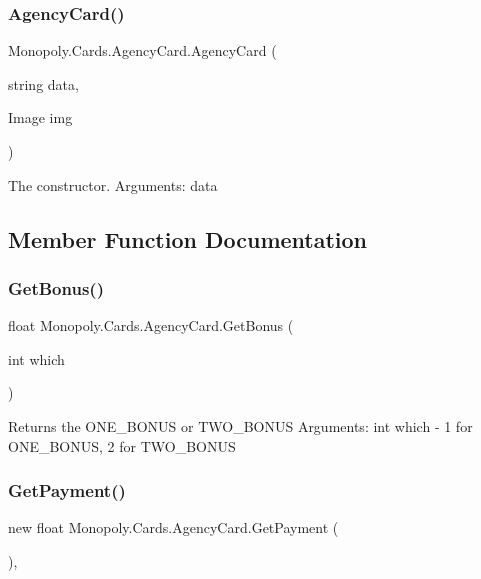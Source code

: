 \subsubsection{\texorpdfstring{Agency\+Card()}{AgencyCard()}}
{\footnotesize\ttfamily Monopoly.\+Cards.\+Agency\+Card.\+Agency\+Card (\begin{DoxyParamCaption}\item[{string}]{data,  }\item[{Image}]{img }\end{DoxyParamCaption})\hspace{0.3cm}{\ttfamily [inline]}}

The constructor. Arguments\+: data 

\subsection{Member Function Documentation}
\mbox{\label{class_monopoly_1_1_cards_1_1_agency_card_af4892a0f8424badd42a01306e705e619}} 
\subsubsection{\texorpdfstring{Get\+Bonus()}{GetBonus()}}
{\footnotesize\ttfamily float Monopoly.\+Cards.\+Agency\+Card.\+Get\+Bonus (\begin{DoxyParamCaption}\item[{int}]{which }\end{DoxyParamCaption})\hspace{0.3cm}{\ttfamily [inline]}}

Returns the O\+N\+E\+\_\+\+B\+O\+N\+US or T\+W\+O\+\_\+\+B\+O\+N\+US Arguments\+: int which -\/ 1 for O\+N\+E\+\_\+\+B\+O\+N\+US, 2 for T\+W\+O\+\_\+\+B\+O\+N\+US \mbox{\label{class_monopoly_1_1_cards_1_1_agency_card_a7463b9f93db864ea03b2e0d6b2973e41}} 
\subsubsection{\texorpdfstring{Get\+Payment()}{GetPayment()}\hspace{0.1cm}{\footnotesize\ttfamily [1/2]}}
{\footnotesize\ttfamily new float Monopoly.\+Cards.\+Agency\+Card.\+Get\+Payment (\begin{DoxyParamCaption}{ }\end{DoxyParamCaption})\hspace{0.3cm}{\ttfamily [inline]}, {\ttfamily [virtual]}}

